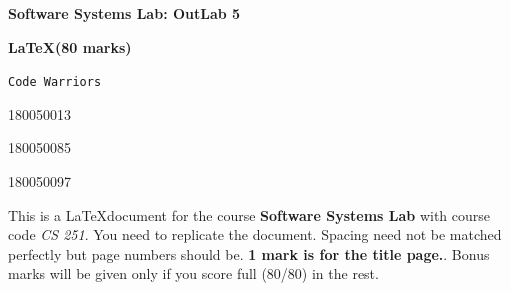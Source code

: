 \documentclass[a4paper, 10pt, fullpage]{article}
\begin{document}
\begin{titlepage}
   \begin{center}
       \vspace*{4cm}
 
       \huge \textbf{ Software Systems Lab: OutLab 5}
 
       \vspace{0.5cm}
        \huge \textbf{\LaTeX (80 marks)}
 
       \vspace{1.5cm}
 
       \large \texttt{Code Warriors}
 
       \vspace{1cm}
      \large 180050013
     
      \large 180050085

      \large 180050097 
      \date{\today}
      
   \end{center}
\end{titlepage}

\newpage

\tableofcontents
{}
\newpage

This is a \LaTeX document for the course \textbf{Software Systems Lab} with course code \textsl{CS 251}. You need to replicate the document. Spacing need not be matched perfectly but page numbers should be. \textbf{1 mark is for the title page.}. Bonus marks will be given only if you score full (80/80) in the rest.
\end{document}
